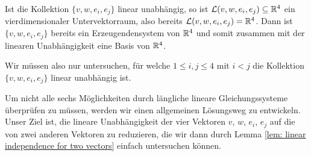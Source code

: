 \documentclass[a4paper,10pt]{article}
\begin{document}
Ist die Kollektion $\{v,w,e_i,e_j\}$ linear unabhängig, so ist $\mathcal{L}(v,w,e_i,e_j) \subseteq \mathbb{R}^4$ ein vierdimensionaler Untervektorraum, also bereits $\mathcal{L}(v,w,e_i,e_j) = \mathbb{R}^4$. Dann ist $\{v,w,e_i,e_j\}$ bereits ein Erzeugendensystem von $\mathbb{R}^4$ und somit zusammen mit der linearen Unabhängigkeit eine Basis von $\mathbb{R}^4$.

Wir müssen also nur untersuchen, für welche $1 \leq i, j \leq 4$ mit $i < j$ die Kollektion $\{v,w,e_i,e_j\}$ linear unabhängig ist.

Um nicht alle sechs Möglichkeiten durch längliche lineare Gleichungssysteme überprüfen zu müssen, werden wir einen allgemeinen Lösungsweg zu entwickeln. Unser Ziel ist, die lineare Unabhängigkeit der vier Vektoren $v$, $w$, $e_i$, $e_j$ auf die von zwei anderen Vektoren zu reduzieren, die wir dann durch Lemma \ref{lem: linear independence for two vectors} einfach untersuchen können.
\end{document}
